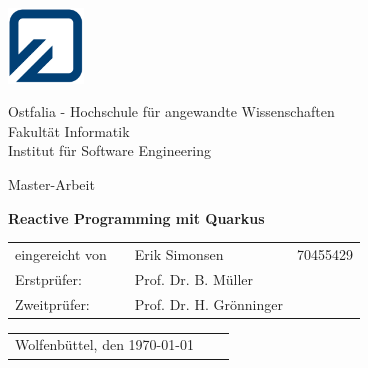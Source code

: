 \begin{minipage}{2.1cm}
	\includegraphics[width=2cm]{resources/fh_logo_klein.jpg}
\end{minipage}
\begin{minipage}{10.0cm}
	Ostfalia - Hochschule für angewandte Wissenschaften\\
	Fakultät Informatik\\
	Institut für Software Engineering
\end{minipage}

\vspace{35mm}

\begin{center}
	{\LARGE Master-Arbeit}
	\\[10mm]
\end{center}

\begin{center}
	\LARGE \textbf{Reactive Programming mit Quarkus\\[28mm]}
\end{center}

\begin{table}[h]
	\centering
	\hspace{50mm}\begin{tabular}{lcll}
		eingereicht von &  & Erik Simonsen           & 70455429 \\

		Erstprüfer:     &  & Prof. Dr. B. Müller     &          \\
		Zweitprüfer:    &  & Prof. Dr. H. Grönninger &          \\
	\end{tabular}
\end{table}

\vspace{30mm}

\begin{table}[h]
	\begin{tabular}{lll}
		Wolfenbüttel, den \today \\
	\end{tabular}
\end{table}
\clearpage
